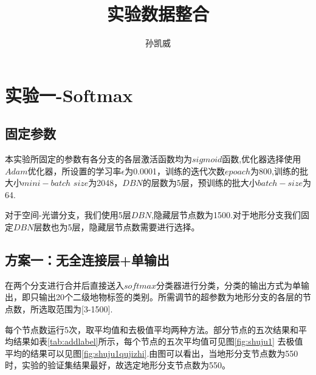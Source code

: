 \documentclass[lang=cn,11pt,a4paper,cite=authoryear]{elegantpaper}
\title{实验数据整合}
\author{孙凯威}
\institute{\href{sunkaiwei@cug.edu.cn}{中国地质大学（武汉）}}
\date{\zhtoday}
\begin{document}
\maketitle

\section{实验一-Softmax}

\subsection{固定参数}

本实验所固定的参数有各分支的各层激活函数均为$sigmoid$函数,优化器选择使用$Adam$优化器，所设置的学习率$\epsilon$为0.0001，训练的迭代次数$epoach$为800,训练的批大小$mini-batch$ $size$为2048，$DBN$的层数为5层，预训练的批大小$batch-size$为64.

对于空间-光谱分支，我们使用5层$DBN$,隐藏层节点数为1500.对于地形分支我们固定$DBN$层数也为5层，隐藏层节点数需要进行选择。

\subsection{方案一：无全连接层+单输出}
在两个分支进行合并后直接送入$softmax$分类器进行分类，分类的输出方式为单输出，即只输出20个二级地物标签的类别。所需调节的超参数为地形分支的各层的节点数，所选取范围为[3-1500].

每个节点数运行5次，取平均值和去极值平均两种方法。部分节点的五次结果和平均结果如表\ref{tab:addlabel}所示，每个节点的五次平均值可见图\ref{fig:shuju1}
去极值平均的结果可以见图\ref{fig:shuju1qujizhi}.由图可以看出，当地形分支节点数为550时，实验的验证集结果最好，故选定地形分支节点数为550。
\end{document}

